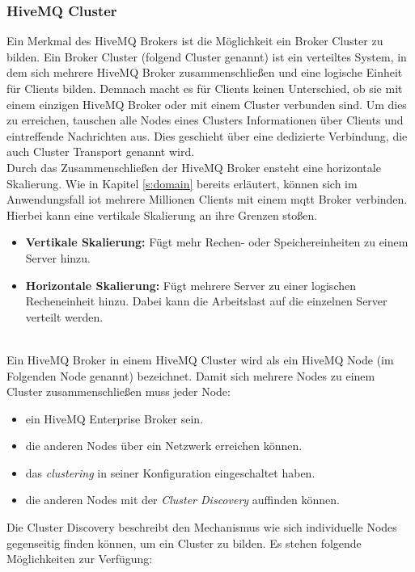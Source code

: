 \subsubsection{HiveMQ Cluster} \label{s:hivemq-cluster}
Ein Merkmal des HiveMQ Brokers ist die Möglichkeit ein Broker Cluster zu bilden.
Ein Broker Cluster (folgend Cluster genannt) ist ein verteiltes System, in dem sich mehrere HiveMQ Broker zusammenschlie{\ss}en und eine logische Einheit für Clients bilden.
Demnach macht es für Clients keinen Unterschied, ob sie mit einem einzigen HiveMQ Broker oder mit einem Cluster verbunden sind.
Um dies zu erreichen, tauschen alle Nodes eines Clusters Informationen über Clients und eintreffende Nachrichten aus. Dies geschieht über eine dedizierte Verbindung, die auch Cluster Transport genannt wird.
\cite{HiveMQClusterHiveMQ}
\\
Durch das Zusammenschlie{\ss}en der HiveMQ Broker ensteht eine horizontale Skalierung. Wie in Kapitel \ref{s:domain} bereits erläutert, können sich im Anwendungsfall \ac{iot} mehrere Millionen Clients mit einem \ac{mqtt} Broker verbinden. Hierbei kann eine vertikale Skalierung an ihre Grenzen sto{\ss}en.
\begin{itemize}
    \item \textbf{Vertikale Skalierung:} Fügt mehr Rechen- oder Speichereinheiten zu einem Server hinzu.
    \item \textbf{Horizontale Skalierung:} Fügt mehrere Server zu einer logischen Recheneinheit hinzu. Dabei kann die Arbeitslast auf die einzelnen Server verteilt werden.
\end{itemize}
\cite{HowScaleIT}
\\
Ein HiveMQ Broker in einem HiveMQ Cluster wird als ein HiveMQ Node (im Folgenden Node genannt) bezeichnet.
Damit sich mehrere Nodes zu einem Cluster zusammenschlie{\ss}en muss jeder Node:
\begin{itemize}
    \item ein HiveMQ Enterprise Broker sein.
    \item die anderen Nodes über ein Netzwerk erreichen können.
    \item das \textit{clustering} in seiner Konfiguration eingeschaltet haben.
    \item die anderen Nodes mit der \textit{Cluster Discovery} auffinden können.
\end{itemize}
Die Cluster Discovery beschreibt den Mechanismus wie sich individuelle Nodes gegenseitig finden können, um ein Cluster zu bilden. Es stehen folgende Möglichkeiten zur Verfügung:
